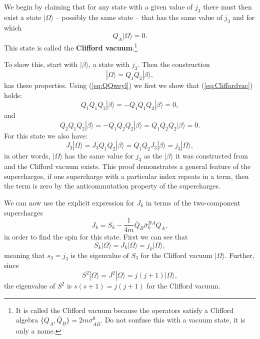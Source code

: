 \documentclass[notes.tex]{subfiles}
\begin{document}
We begin by claiming that for any state with a given value of $j_3$ there must then exist a state $|\Omega\rangle$ -- possibly the same state -- that has the same value of $j_3$ and for which
\begin{equation}
Q_A|\Omega\rangle = 0.\label{eq:Cliffordvac}
\end{equation}
This state is called the {\bf Clifford vacuum}.\footnote{It is called the Clifford vacuum because the operators satisfy a Clifford algebra $\{Q_A, \bar{Q}_{\dot{B}}\} = 2m\sigma^0_{A\dot{B}}$. Do not confuse this with a vacuum state, it is only a name.} 

To show this, start with $|\beta\rangle$, a state with $j_3$. Then the construction
\[ |\Omega\rangle=Q_1Q_2|\beta\rangle,\]
has these properties. Using (\ref{eq:QQweyl}) we first we show that (\ref{eq:Cliffordvac}) holds:
\[Q_1Q_1Q_2|\beta\rangle = -Q_1Q_1Q_2|\beta \rangle = 0,\]
and
\[Q_2Q_1Q_2|\beta\rangle = -Q_1Q_2Q_2|\beta\rangle = Q_1Q_2Q_2|\beta\rangle= 0.\]
For this state we also  have:
\begin{equation*}
J_3 |\Omega\rangle = J_3Q_1Q_2|\beta\rangle =Q_1Q_2J_3|\beta\rangle = j_3|\Omega\rangle,
\end{equation*}
in other words, $|\Omega\rangle$ has the same value for $j_3$ as the $|\beta\rangle$ it was constructed from and  the Clifford vacuum exists. This proof demonstrates a general feature of the supercharges, if one supercharge with a particular index repeats in a term, then the term is zero by the anticommutation property of the supercharges.

We can now use the explicit expression  for $J_k$ in terms of the two-component supercharges
\begin{equation}
J_k = S_k - \frac{1}{4m}\bar{Q}_{\dot{B}}\bar{\sigma}_k^{\dot{B}A}Q_A,
\label{eq:Jk_twocomp}
\end{equation}
in order to find the spin for this state. First we can see that
\[S_k|\Omega\rangle = J_k|\Omega\rangle =j_k|\Omega\rangle,\]
meaning that $s_3 = j_3$ is the eigenvalue of $S_3$ for the Clifford vacuum $|\Omega\rangle$. Further, since 
\[S^2|\Omega\rangle = J^2|\Omega\rangle =j(j+1)|\Omega\rangle,\]
the eigenvalue of $S^2$ is $s(s+1)=j(j+1)$ for the Clifford vacuum.
\end{document}
